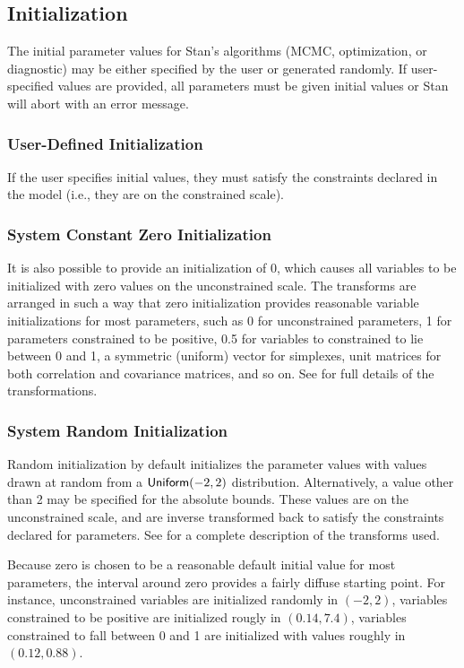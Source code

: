 \subsection{Initialization}

The initial parameter values for Stan's algorithms (MCMC,
optimization, or diagnostic) may be either specified by the user or
generated randomly. If user-specified values are provided, all
parameters must be given initial values or Stan will abort with an
error message.

\subsubsection{User-Defined Initialization}

If the user specifies initial values, they must satisfy the
constraints declared in the model (i.e., they are on the constrained
scale).

\subsubsection{System Constant Zero Initialization}

It is also possible to provide an initialization of 0, which causes
all variables to be initialized with zero values on the unconstrained
scale. The transforms are arranged in such a way that zero
initialization provides reasonable variable initializations for most
parameters, such as 0 for unconstrained parameters, 1 for parameters
constrained to be positive, 0.5 for variables to constrained to lie
between 0 and 1, a symmetric (uniform) vector for simplexes, unit
matrices for both correlation and covariance matrices, and so on. See
 for full details of the
transformations.


\subsubsection{System Random Initialization}

Random initialization by default initializes the parameter values with
values drawn at random from a $\distro{Uniform}(-2,2)$ distribution.
Alternatively, a value other than 2 may be specified for the absolute
bounds. These values are on the unconstrained scale, and are inverse
transformed back to satisfy the constraints declared for parameters.
See  for a complete description of the
transforms used.

Because zero is chosen to be a reasonable default initial value for
most parameters, the interval around zero provides a fairly diffuse
starting point. For instance, unconstrained variables are initialized
randomly in $(-2,2)$, variables constrained to be positive are
initialized rougly in $(0.14,7.4)$, variables constrained to fall
between 0 and 1 are initialized with values roughly in $(0.12,0.88)$.


